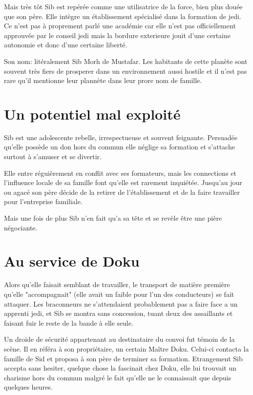 \documentclass[10pt,a4paper,twoside,twocolumn,openany]{book}
\begin{document}
Mais très tôt Sib est repérée comme une utilisatrice de la force, bien plus douée que son père. Elle intègre
un établissement spécialisé dans la formation de jedi. Ce n'est pas à proprement parlé une académie car elle n'est pas officiellement approuvée par le conseil jedi mais la bordure exterieure jouit d'une certaine autonomie et donc d'une certaine liberté.

\begin{commentbox}{}
Son nom: litéralement Sib Morh de Mustafar. Les habitants de cette planète sont souvent très fiers de prosperer dans un
environnement aussi hostile et il n'est pas rare qu'il mentionne leur plannète dans leur prore nom de famille.
\end{commentbox}

\section{Un potentiel mal exploité}

Sib est une adolescente rebelle, irrespectueuse et souvent feignante. Persuadée qu'elle possède un don hors du commun elle néglige sa formation et s'attache surtout à s'amuser et se divertir.

Elle entre réguièrement en conflit avec ses formateurs, mais les connections et l'influence locale de sa famille font qu'elle est rarement inquiétée. Jusqu'au jour ou agacé son père décide de la retirer de l'établissement et de la faire travailler pour l'entreprise familiale.

Mais une fois de plus Sib n'en fait qu'a sa tête et se revèle être une pière négociante.

\section{Au service de Doku}

Alors qu'elle faisait semblant de travailler, le transport de matière première qu'elle "accompagnait" (elle avait un faible pour l'un des conducteurs) se fait attaquer. Les braconneurs ne s'attendaient probablement pas a faire face a un apprenti jedi, et Sib se montra sans concession, tuant deux des assaillants et faisant fuir le reste de la bande à elle seule.   

Un droide de sécurité appartenant au destinataire du convoi fut témoin de la scène. Il en référa à son propriétaire, un certain Maître Doku. Celui-ci contacta la famille de Sid et proposa à son père de terminer sa formation.
Etrangement Sib accepta sans hesiter, quelque chose la fascinait chez Doku, elle lui trouvait un charisme hors \color{white} du commun malgré le fait qu'elle ne le connaissait que depuis quelques heures.
\end{document}
